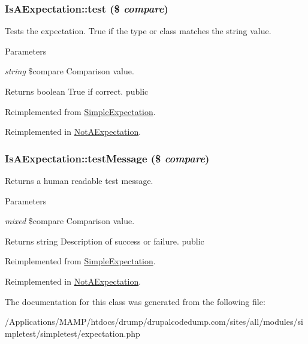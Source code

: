 \hypertarget{class_is_a_expectation_a759f6a0c54751334dbb7a8aed01a3858}{
\subsubsection[{test}]{\setlength{\rightskip}{0pt plus 5cm}IsAExpectation::test (\$ {\em compare})}}
\label{class_is_a_expectation_a759f6a0c54751334dbb7a8aed01a3858}
Tests the expectation. True if the type or class matches the string value. 
\begin{DoxyParams}{Parameters}
\item[{\em string}]\$compare Comparison value. \end{DoxyParams}
\begin{DoxyReturn}{Returns}
boolean True if correct.  public 
\end{DoxyReturn}


Reimplemented from \hyperlink{class_simple_expectation_aa2b98f827e7487ebe12cedb9ad39d061}{SimpleExpectation}.

Reimplemented in \hyperlink{class_not_a_expectation_a627e4e3a4514de8f869eaa5f62a5e206}{NotAExpectation}.\hypertarget{class_is_a_expectation_af5e73859e22cd3ed97e13edda31de53e}{
\subsubsection[{testMessage}]{\setlength{\rightskip}{0pt plus 5cm}IsAExpectation::testMessage (\$ {\em compare})}}
\label{class_is_a_expectation_af5e73859e22cd3ed97e13edda31de53e}
Returns a human readable test message. 
\begin{DoxyParams}{Parameters}
\item[{\em mixed}]\$compare Comparison value. \end{DoxyParams}
\begin{DoxyReturn}{Returns}
string Description of success or failure.  public 
\end{DoxyReturn}


Reimplemented from \hyperlink{class_simple_expectation_a15b69edf659c76f6543aa98d8d85b025}{SimpleExpectation}.

Reimplemented in \hyperlink{class_not_a_expectation_aecc6099e1b98a0b00f798e43a8add4fa}{NotAExpectation}.

The documentation for this class was generated from the following file:\begin{DoxyCompactItemize}
\item 
/Applications/MAMP/htdocs/drump/drupalcodedump.com/sites/all/modules/simpletest/simpletest/expectation.php\end{DoxyCompactItemize}

